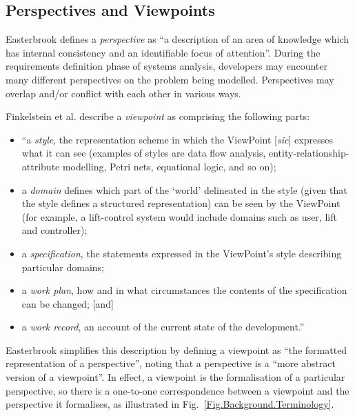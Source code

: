 \documentclass[10pt]{llncs}
\begin{document}


\subsection{Perspectives and Viewpoints}
\label{Sec:Background:Viewpoints:Perspectives}

Easterbrook \cite{East:SM:1991:PhD} defines a \emph{perspective} as ``a description of an area of knowledge which has internal consistency and an identifiable focus of attention''. During the requirements definition phase of systems analysis, developers may encounter many different perspectives on the problem being modelled. Perspectives may overlap and/or conflict with each other in various ways.

Finkelstein et al. \cite{Fink:ACW:1989} describe a \emph{viewpoint} as comprising the following parts:
\begin{itemize}
	\item ``a \emph{style}, the representation scheme in which the ViewPoint [\emph{sic}] expresses what it can see (examples of styles are data flow analysis, entity-relationship-attribute modelling, Petri nets, equational logic, and so on);
	\item a \emph{domain} defines which part of the `world' delineated in the style (given that the style defines a structured representation) can be seen by the ViewPoint (for example, a lift-control system would include domains such as user, lift and controller);
	\item a \emph{specification}, the statements expressed in the ViewPoint's style describing particular domains;
	\item a \emph{work plan}, how and in what circumstances the contents of the specification can be changed; [and]
	\item a \emph{work record}, an account of the current state of the development.''
\end{itemize}

Easterbrook \cite{East:SM:1991:PhD} simplifies this description by defining a viewpoint as ``the formatted representation of a perspective'', noting that a perspective is a ``more abstract version of a viewpoint''. In effect, a viewpoint is the formalisation of a particular perspective, so there is a one-to-one correspondence between a viewpoint and the perspective it formalises, as illustrated in Fig.~\ref{Fig.Background.Terminology}.
\end{document}
